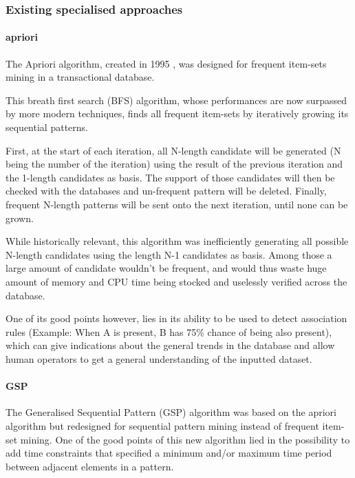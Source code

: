 \documentclass{eplmastersthesis}
\begin{document}
\subsubsection{Existing specialised approaches}

\paragraph{apriori}

The Apriori algorithm, created in 1995 \cite{agrawal1995mining}, was designed for frequent item-sets mining in a transactional database.\newline

This breath first search (BFS) algorithm, whose performances are now surpassed by more modern techniques, finds all frequent item-sets by iteratively growing its sequential patterns. \newline

First, at the start of each iteration, all N-length candidate will be generated (N being the number of the iteration) using the result of the previous iteration and the 1-length candidates as basis. The support of those candidates will then be checked with the databases and un-frequent pattern will be deleted. Finally, frequent N-length patterns will be sent onto the next iteration, until none can be grown. \newline

While historically relevant, this algorithm was inefficiently generating all possible N-length candidates using the length N-1 candidates as basis. Among those a large amount of candidate wouldn't be frequent, and would thus waste huge amount of memory and CPU time being stocked and uselessly verified across the database. \newline

One of its good points however, lies in its ability to be used to detect association rules (Example: When A is present, B has 75\% chance of being also present), which can give indications about the general trends in the database and allow human operators to get a general understanding of the inputted dataset.

\paragraph{GSP}

The Generalised Sequential Pattern (GSP) algorithm \cite{srikant1996mining} was based on the apriori algorithm but redesigned for sequential pattern mining instead of frequent item-set mining. One of the good points of this new algorithm lied in the possibility to add time constraints that specified a minimum and/or maximum time period between adjacent elements in a pattern. \newline
\end{document}

